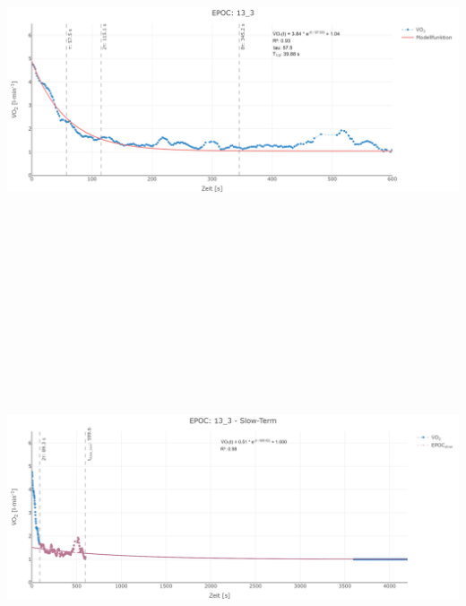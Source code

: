 \documentclass[
  letterpaper,
  DIV=11]{scrartcl}
\begin{document}
\includegraphics[width=11.45833in,height=4.6875in]{images/13_3_tau.png}
\includegraphics[width=11.45833in,height=4.6875in]{images/13_3_slow.png}
\end{document}
